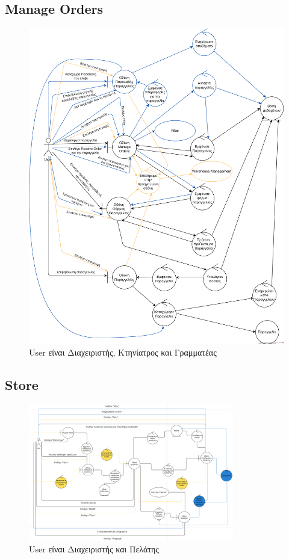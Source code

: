 \documentclass[12pt,a4paper,twoside]{book}
\begin{document}
\subsection{Manage Orders}
\begin{figure}[H]
    \centering
    \includegraphics[width=\textwidth]{Resources/Robustness Diagram/Manage_Orders_RD.png}
    \caption{User είναι Διαχειριστής, Κτηνίατρος και Γραμματέας}\label{fig:robustness-manage-orders}
\end{figure}

\subsection{Store}
\begin{figure}[H]
    \centering
    \includegraphics[width=0.8\textwidth]{Resources/Robustness Diagram/Store.png}
    \caption{User είναι Διαχειριστής και Πελάτης}\label{fig:robustness-store}
\end{figure}
\end{document}
